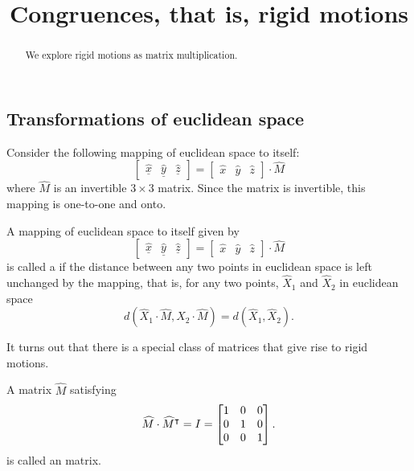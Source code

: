 \documentclass{ximera}
\title{Congruences, that is, rigid motions}
\begin{document}
\begin{abstract}
We explore rigid motions as matrix multiplication.
\end{abstract}
\maketitle

\subsection*{Transformations of euclidean space}

Consider the following mapping of euclidean space to itself:%
\[
\begin{bmatrix}
\underline{\hat{x}} & \underline{\hat{y}} & \underline{\hat{z}}%
\end{bmatrix}
=
\begin{bmatrix} \hat{x} & \hat{y} & \hat{z}%
\end{bmatrix}
\cdot\hat{M}
\]
where $\hat{M}$ is an invertible $3\times3$ matrix. Since the matrix
is invertible, this mapping is one-to-one and onto.

\begin{definition}
  A mapping of euclidean space to itself given by
  \[
\begin{bmatrix}
\underline{\hat{x}} & \underline{\hat{y}} & \underline{\hat{z}}%
\end{bmatrix}
=
\begin{bmatrix} \hat{x} & \hat{y} & \hat{z}%
\end{bmatrix}
\cdot\hat{M}
  \]
  is called a  if the distance between any two
points in euclidean space is left unchanged by the mapping, that is, for
any two points, $\hat{X}_{1}$ and $\hat{X}_{2}$ in euclidean space%
\[
d\left( \hat{X}_{1}  \cdot\hat{M},\hat{X}_{2}
\cdot\hat{M}\right)  =d\left(  \hat{X}_{1},\hat{X}_{2}\right).
\]
\end{definition}

It turns out that there is a special class of matrices that give rise
to rigid motions.

\begin{definition}
  A matrix $\hat{M}$ satisfying
  \[
  \widehat{M}\cdot\widehat{M}^\intercal=I=\begin{bmatrix}
  1 & 0 & 0\\
  0 & 1 & 0\\
  0 & 0 & 1
  \end{bmatrix}.
  \]
  is called an  matrix.
\end{definition}
\end{document}
